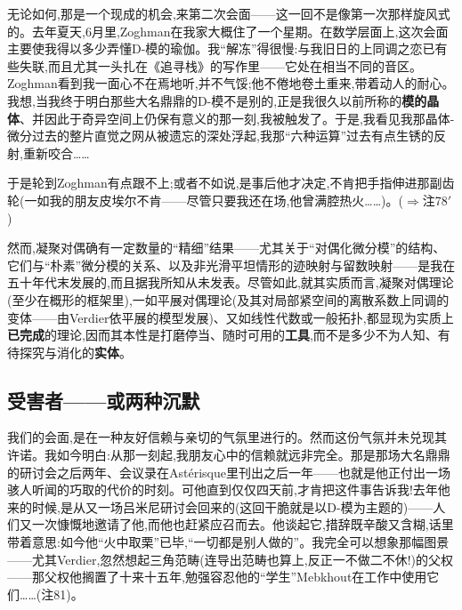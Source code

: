 无论如何,那是一个现成的机会,来第二次会面——这一回不是像第一次那样旋风式的。去年夏天,6月里,Zoghman在我家大概住了一个星期。在数学层面上,这次会面主要使我得以多少弄懂D-模的瑜伽。我“解冻”得很慢:与我旧日的上同调之恋已有些失联,而且尤其一头扎在《追寻栈》的写作里——它处在相当不同的音区。Zoghman看到我一面心不在焉地听,并不气馁;他不倦地卷土重来,带着动人的耐心。我想,当我终于明白那些大名鼎鼎的D-模不是别的,正是我很久以前所称的\textbf{模的晶体}、并因此于奇异空间上仍保有意义的那一刻,我被触发了。于是,我看见我那晶体-微分过去的整片直觉之网从被遗忘的深处浮起,我那“六种运算”过去有点生锈的反射,重新咬合……

于是轮到Zoghman有点跟不上;或者不如说,是事后他才决定,不肯把手指伸进那副齿轮(一如我的朋友皮埃尔不肯——尽管只要我还在场,他曾满腔热火……)。($\Rightarrow$注78$'$)


\dmark{}然而,凝聚对偶确有一定数量的“精细”结果——尤其关于“对偶化微分模”的结构、它们与“朴素”微分模的关系、以及非光滑平坦情形的迹映射与留数映射——是我在五十年代末发展的,而且据我所知从未发表。尽管如此,就其实质而言,凝聚对偶理论(至少在概形的框架里),一如平展对偶理论(及其对局部紧空间的离散系数上同调的变体——由Verdier依平展的模型发展)、又如线性代数或一般拓扑,都显现为实质上\textbf{已完成}的理论,因而其本性是打磨停当、随时可用的\textbf{工具},而不是多少不为人知、有待探究与消化的\textbf{实体}。

\subsection{受害者——或两种沉默}


我们的会面,是在一种友好信赖与亲切的气氛里进行的。然而这份气氛并未兑现其许诺。我如今明白:从那一刻起,我朋友心中的信赖就远非完全。那是那场大名鼎鼎的研讨会之后两年、会议录在Astérisque里刊出之后一年——也就是他正付出一场骇人听闻的巧取的代价的时刻。可他直到仅仅四天前,才肯把这件事告诉我!去年他来的时候,是从又一场吕米尼研讨会\dmark{}回来的(这回干脆就是以D-模为主题的)——人们又一次慷慨地邀请了他,而他也赶紧应召而去。他谈起它,措辞既辛酸又含糊,话里带着意思:如今他“火中取栗”已毕,“一切都是别人做的”。我完全可以想象那幅图景——尤其Verdier,忽然想起三角范畴(连导出范畴也算上,反正一不做二不休!)的父权——那父权他搁置了十来十五年,勉强容忍他的“学生”Mebkhout在工作中使用它们……(注81)。

